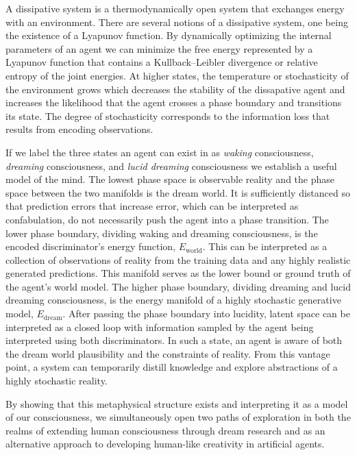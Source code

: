 \documentclass{article}
\begin{document}
A dissipative system is a thermodynamically open system that exchanges energy with an environment. There are several notions of a dissipative system, one being the existence of a Lyapunov function. By dynamically optimizing the internal parameters of an agent we can minimize the free energy represented by a Lyapunov function that contains a Kullback–Leibler divergence or relative entropy of the joint energies. At higher states, the temperature or stochasticity of the environment grows which decreases the stability of the dissapative agent and increases the likelihood that the agent crosses a phase boundary and transitions its state. The degree of stochasticity corresponds to the information loss that results from encoding observations. 

If we label the three states an agent can exist in as \textit{waking} consciousness, \textit{dreaming} consciousness, and \textit{lucid dreaming} consciousness we establish a useful model of the mind. The lowest phase space is observable reality and the phase space between the two manifolds is the dream world. It is sufficiently distanced so that prediction errors that increase error, which can be interpreted as confabulation, do not necessarily push the agent into a phase transition. The lower phase boundary, dividing waking and dreaming consciousness, is the encoded discriminator's energy function, $E_{\text{world}}$. This can be interpreted as a collection of observations of reality from the training data and any highly realistic generated predictions. This manifold serves as the lower bound or ground truth of the agent's world model. The higher phase boundary, dividing dreaming and lucid dreaming consciousness, is the energy manifold of a highly stochastic generative model, $E_{\text{dream}}$.  After passing the phase boundary into lucidity, latent space can be interpreted as a closed loop with information sampled by the agent being interpreted using both discriminators. In such a state, an agent is aware of both the dream world plausibility and the constraints of reality. From this vantage point, a system can temporarily distill knowledge and explore abstractions of a highly stochastic reality. 

By showing that this metaphysical structure exists and interpreting it as a model of our consciousness, we simultaneously open two paths of exploration in both the realms of extending human consciousness through dream research and as an alternative approach to developing human-like creativity in artificial agents.
\end{document}
